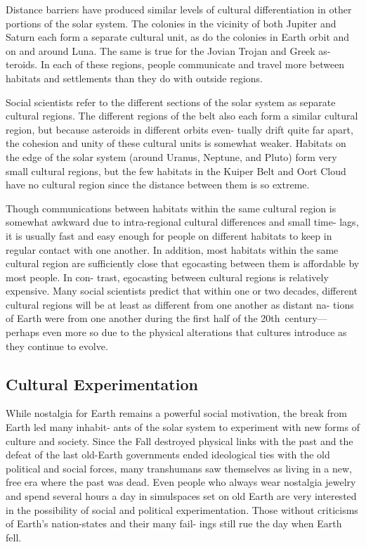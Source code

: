 Distance barriers have produced similar levels of 
cultural differentiation in other portions of the solar 
system. The colonies in the vicinity of both Jupiter 
and Saturn each form a separate cultural unit, as do 
the colonies in Earth orbit and on and around Luna. 
The same is true for the Jovian Trojan and Greek as-
teroids. In each of these regions, people communicate 
and travel more between habitats and settlements 
than they do with outside regions.

Social scientists refer to the different sections of the 
solar system as separate cultural regions. The different 
regions of the belt also each form a similar cultural 
region, but because asteroids in different orbits even-
tually drift quite far apart, the cohesion and unity of 
these cultural units is somewhat weaker. Habitats on 
the edge of the solar system (around Uranus, Neptune, 
and Pluto) form very small cultural regions, but the 
few habitats in the Kuiper Belt and Oort Cloud have 
no cultural region since the distance between them is 
so extreme.

Though communications between habitats within 
the same cultural region is somewhat awkward due 
to intra-regional cultural differences and small time-
lags, it is usually fast and easy enough for people on 
different habitats to keep in regular contact with one 
another. In addition, most habitats within the same 
cultural region are sufficiently close that egocasting 
between them is affordable by most people. In con-
trast, egocasting between cultural regions is relatively 
expensive. Many social scientists predict that within 
one or two decades, different cultural regions will be 
at least as different from one another as distant na-
tions of Earth were from one another during the first 
half of the 20th century—perhaps even more so due 
to the physical alterations that cultures introduce as 
they continue to evolve.

\subsection{Cultural Experimentation}

While nostalgia for Earth remains a powerful social 
motivation, the break from Earth led many inhabit-
ants of the solar system to experiment with new 
forms of culture and society. Since the Fall destroyed 
physical links with the past and the defeat of the last 
old-Earth governments ended ideological ties with the 
old political and social forces, many transhumans saw 
themselves as living in a new, free era where the past 
was dead. Even people who always wear nostalgia 
jewelry and spend several hours a day in simulspaces 
set on old Earth are very interested in the possibility 
of social and political experimentation. Those without 
criticisms of Earth's nation-states and their many fail-
ings still rue the day when Earth fell.

